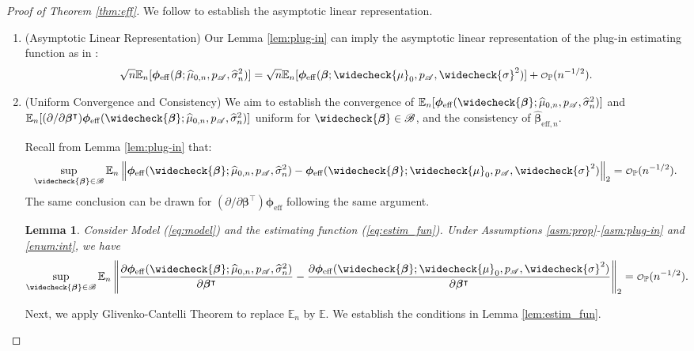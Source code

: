 \documentclass[11pt]{article}
\numberwithin{equation}{section}
\newtheorem{lem}{Lemma}[section]
\theoremstyle{definition}
\theoremstyle{remark}
\newcommand{\bbeta}{\bm{\beta}}
\newcommand{\bphi}{\bm{\phi}}
\newcommand{\bbE}{\mathbb{E}}
\newcommand{\bbP}{\mathbb{P}}
\newcommand{\sA}{\mathscr{A}}
\newcommand{\sB}{\mathscr{B}}
\newcommand\smallcO{
	\mathchoice
	{{\scriptstyle\mathcal{O}}}%
	{{\scriptstyle\mathcal{O}}}%
	{{\scriptscriptstyle\mathcal{O}}}%
	{\scalebox{.5}{$\scriptscriptstyle\mathcal{O}$}}%
}
\newcommand{\eff}{\mathrm{eff}}
\begin{document}
\begin{proof}[Proof of Theorem \ref{thm:eff}]
	We follow \citet[Lemmas 5.1-5.3]{newey1994asymptotic} to establish the asymptotic linear representation. 
	
	\begin{enumerate}[label=\textbf{Step \Roman*:},leftmargin=0cm]
		\item (Asymptotic Linear Representation) Our Lemma \ref{lem:plug-in} can imply the asymptotic linear representation of the plug-in estimating function as in \citet[Lemma 5.1]{newey1994asymptotic}:
		\[ \sqrt{n}\bbE_{n}[\bphi_{\eff}(\bbeta;\widehat{\mu}_{0,n},p_{\sA},\widehat{\sigma}_{n}^{2})] = \sqrt{n}\bbE_{n}[\bphi_{\eff}(\bbeta;\widecheck{\mu}_{0},p_{\sA},\widecheck{\sigma}^{2})] + \smallcO_{\bbP}(n^{-1/2}). \]
		
		\item (Uniform Convergence and Consistency) We aim to establish the convergence of $ \bbE_{n}[\bphi_{\eff}(\widecheck{\bbeta};\widehat{\mu}_{0,n},p_{\sA},\widehat{\sigma}_{n}^{2})] $ and $ \bbE_{n}[(\partial/\partial\bbeta^{\intercal})\bphi_{\eff}(\widecheck{\bbeta};\widehat{\mu}_{0,n},p_{\sA},\widehat{\sigma}_{n}^{2})] $ uniform for $ \widecheck{\bbeta} \in \sB $, and the consistency of $ \widehat{\bbeta}_{\eff,n} $.
		
		Recall from Lemma \ref{lem:plug-in} that:
		\[ \sup_{\widecheck{\bbeta} \in \sB} \bbE_{n}\left\| \bphi_{\eff}(\widecheck{\bbeta};\widehat{\mu}_{0,n},p_{\sA},\widehat{\sigma}_{n}^{2}) - \bphi_{\eff}(\widecheck{\bbeta};\widecheck{\mu}_{0},p_{\sA},\widecheck{\sigma}^{2}) \right\|_{2} = \smallcO_{\bbP}(n^{-1/2}). \]
		The same conclusion can be drawn for $ (\partial/\partial\bbeta^{\intercal})\bphi_{\eff} $ following the same argument.
		
		\begin{lem}\label{lem:plug-in_grad}
			Consider Model (\ref{eq:model}) and the estimating function (\ref{eq:estim_fun}). Under Assumptions \ref{asm:prop}-\ref{asm:plug-in} and \ref{enum:int}, we have
			\[ \sup_{\widecheck{\bbeta} \in \sB} \bbE_{n}\left\| {\partial \bphi_{\eff}(\widecheck{\bbeta};\widehat{\mu}_{0,n},p_{\sA},\widehat{\sigma}_{n}^{2})\over \partial \bbeta^{\intercal}} - {\partial \bphi_{\eff}(\widecheck{\bbeta};\widecheck{\mu}_{0},p_{\sA},\widecheck{\sigma}^{2})\over \partial \bbeta^{\intercal}} \right\|_{2} = \smallcO_{\bbP}(n^{-1/2}). \]
		\end{lem}
		
		Next, we apply Glivenko-Cantelli Theorem to replace $ \bbE_{n} $ by $ \bbE $. We establish the conditions in Lemma \ref{lem:estim_fun}.
		

\end{enumerate}
\end{proof}
\end{document}
